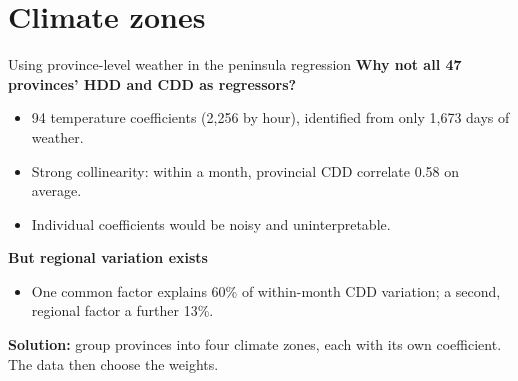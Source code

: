 \documentclass[aspectratio=169,11pt]{beamer}
\begin{document}
\section{Climate zones}

\begin{frame}{Using province-level weather in the peninsula regression}
  \textbf{Why not all 47 provinces' HDD and CDD as regressors?}
  \begin{itemize}\small
    \item 94 temperature coefficients (2{,}256 by hour), identified from only 1{,}673
          days of weather.
    \item Strong collinearity: within a month, provincial CDD correlate 0.58 on average.
    \item Individual coefficients would be noisy and uninterpretable.
  \end{itemize}
  \textbf{But regional variation exists}
  \begin{itemize}\small
    \item One common factor explains 60\% of within-month CDD variation; a second,
          regional factor a further 13\%.
  \end{itemize}
  \textbf{Solution:} group provinces into four climate zones, each with its own coefficient.
  The data then choose the weights.
\end{frame}
\end{document}

